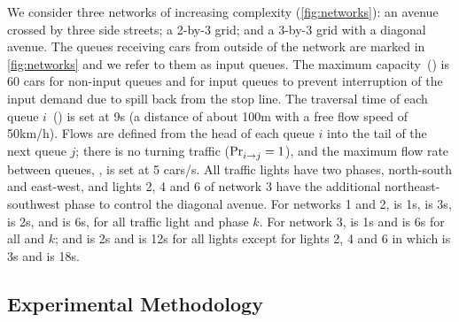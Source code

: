 We consider three networks of increasing complexity (\cref{fig:networks}): an
avenue crossed by three side streets; a 2-by-3 grid; and a 3-by-3 grid with a
diagonal avenue.
%
The queues receiving cars from outside of the network are marked in
\cref{fig:networks} and we refer to them as input queues.
%
The maximum capacity~() is 60 cars for non-input queues and
 for input queues to prevent interruption of the input
demand due to spill back from the stop line. 
%
The traversal time of each queue $i$~() is set at 9s (a distance of
about 100m with a free flow speed of 50km/h).
%
Flows are defined from the head of each queue $i$ into the tail of the next
queue $j$;
%
there is no turning traffic ($\mathrm{Pr}_{i\to j}^{\mathrm{}}=1$), and the maximum flow rate
between queues, , is set at 5 cars/s.
%
All traffic lights have two phases, north-south and east-west, and lights 2, 4
and 6 of network 3 have the additional northeast-southwest phase to control the
diagonal avenue.
%
For networks 1 and 2,  is 1s,  is 3s, \CTMIN{\tl} is
2s, and \CTMAX{\tl} is 6s, for all traffic light \tl and phase $k$.
%
For network 3,  is 1s and  is 6s for all \tl and
$k$; and \CTMIN{\tl} is 2s and \CTMAX{\tl} is 12s for all lights \tl except for
lights 2, 4 and 6 in which \CTMIN{\tl} is 3s and \CTMAX{\tl} is 18s.




\subsection{Experimental Methodology}



